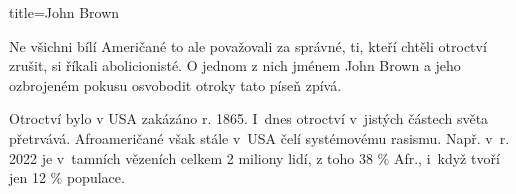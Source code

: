 \begin{song}{title=\predtitle \centering John Brown \\\large  }
{\begin{minipage}{\textwidth}
\begin{small}
Ne všichni bílí Američané to ale považovali za správné, ti, kteří chtěli
otroctví zrušit, si říkali abolicionisté. O jednom z nich jménem John Brown
a jeho ozbrojeném pokusu osvobodit otroky tato píseň zpívá.

Otroctví bylo v USA zakázáno r. 1865.
I~dnes otroctví v~jistých částech světa přetrvává.
Afroameričané však stále v~USA čelí systémovému rasismu.
Např. v~r. 2022 je v~tamních vězeních celkem 2 miliony lidí, z toho 38 \% Afr.,
i~když tvoří jen 12 \% populace.
\end{small}
\end{minipage}
}

\setcounter{Slokočet}{0}
\end{song}

